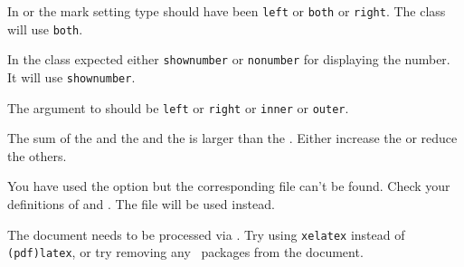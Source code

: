 \begin{plainlist}
\item[]

    In \cmd{\createmark} or \cmd{\createplainmark} the mark setting 
type should have been \texttt{left} or \texttt{both} 
or \texttt{right}. The class will use \texttt{both}.

\item[]

  In \cmd{\createmark} the class expected either \texttt{shownumber} or
\texttt{nonumber} for displaying the number. It will use 
\texttt{shownumber}.

\item[]

    The argument to \cmd{\sidecaption} should be \texttt{left} or 
\texttt{right} or \texttt{inner} or \texttt{outer}.

\item[]

        The sum of the \lnc{\uppermargin} and the \lnc{\textheight}
  and the \lnc{\lowermargin} is
  larger than the \lnc{\paperheight}. Either increase the \lnc{\paperheight}
  or reduce the others.

\item[]

    You have used the  option but the corresponding 
 file can't be found. Check your definitions of
\cmd{\anyptfilebase} and \cmd{\anyptsize}. The  
file will be used instead.

\item[]

   The document needs to be processed via \pixxetx. Try using 
\texttt{xelatex} instead of \texttt{(pdf)latex}, or try removing 
any \pixxetx\ packages from the document.

    

\end{plainlist}


